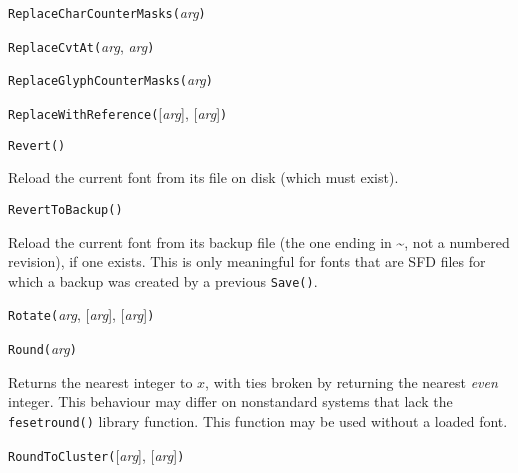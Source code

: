 \texttt{ReplaceCharCounterMasks(}\textit{arg}\texttt{)}



\texttt{ReplaceCvtAt(}\textit{arg}, \textit{arg}\texttt{)}



\texttt{ReplaceGlyphCounterMasks(}\textit{arg}\texttt{)}



\texttt{ReplaceWithReference(}[\textit{arg}], [\textit{arg}]\texttt{)}



\texttt{Revert()}

Reload the current font from its file on disk (which must exist).



\texttt{RevertToBackup()}

Reload the current font from its backup file (the one ending in
\textasciitilde, not a numbered revision), if one exists.  This is only
meaningful for fonts that are SFD files for which a backup was created by a
previous \texttt{Save()}.



\texttt{Rotate(}\textit{arg}, [\textit{arg}], [\textit{arg}]\texttt{)}



\texttt{Round(}\textit{arg}\texttt{)}

Returns the nearest integer to $x$, with ties broken by returning the
nearest \emph{even} integer.  This behaviour may differ on nonstandard
systems that lack the \texttt{fesetround()} library function.
This function may be used without a loaded font.



\texttt{RoundToCluster(}[\textit{arg}], [\textit{arg}]\texttt{)}

